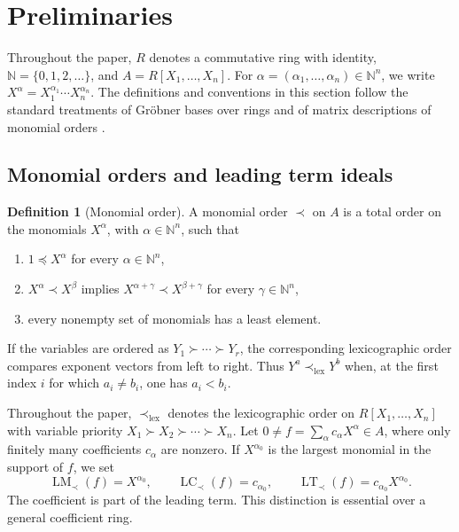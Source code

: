 \documentclass[preprint,12pt,3p]{elsarticle}
\theoremstyle{definition}
\newtheorem{definition}[theorem]{Definition}
\theoremstyle{remark}
\newcommand{\LC}{\operatorname{LC}}
\newcommand{\LT}{\operatorname{LT}}
\newcommand{\LM}{\operatorname{LM}}
\begin{document}
	\section{Preliminaries}\label{sec:preliminaries}
	
	Throughout the paper, $R$ denotes a commutative ring with identity,
	$\mathbb{N}=\{0,1,2,\ldots\}$, and
	$A=R[X_1,\ldots,X_n]$. For
	$\alpha=(\alpha_1,\ldots,\alpha_n)\in\mathbb{N}^n$, we write
	$X^\alpha=X_1^{\alpha_1}\cdots X_n^{\alpha_n}$. The definitions and
	conventions in this section follow the standard treatments of
	Gr\"obner bases over rings and of matrix descriptions of monomial
	orders
	\cite{AdamsLoustaunau1994,Pauer2007,Robbiano1985,Robbiano1986,
		KemperTrungAnh2018,LombardiNeuwirthYengui2026,Yengui2015Book}.
	
	\subsection{Monomial orders and leading term ideals}
	
	\begin{definition}[Monomial order]\label{def:monomial-order}
		A monomial order $\prec$ on $A$ is a total order on the monomials
		$X^\alpha$, with $\alpha\in\mathbb{N}^n$, such that
		\begin{enumerate}
			\item $1\preceq X^\alpha$ for every $\alpha\in\mathbb{N}^n$,
			\item $X^\alpha\prec X^\beta$ implies
			$X^{\alpha+\gamma}\prec X^{\beta+\gamma}$ for every
			$\gamma\in\mathbb{N}^n$,
			\item every nonempty set of monomials has a least element.
		\end{enumerate}
	\end{definition}
	
	If the variables are ordered as
	$Y_1\succ\cdots\succ Y_r$, the corresponding lexicographic order
	compares exponent vectors from left to right. Thus
	$Y^a\prec_{\mathrm{lex}}Y^b$ when, at the first index $i$ for which
	$a_i\neq b_i$, one has $a_i<b_i$.
	
	Throughout the paper, $\prec_{\mathrm{lex}}$ denotes the
	lexicographic order on $R[X_1,\ldots,X_n]$ with variable priority
	$X_1\succ X_2\succ\cdots\succ X_n$. Let $0\neq f=\sum_{\alpha}c_\alpha X^\alpha\in A$, where only
	finitely many coefficients $c_\alpha$ are nonzero. If $X^{\alpha_0}$
	is the largest monomial in the support of $f$, we set
	\[
	\LM_\prec(f)=X^{\alpha_0},\qquad
	\LC_\prec(f)=c_{\alpha_0},\qquad
	\LT_\prec(f)=c_{\alpha_0}X^{\alpha_0}.
	\]
	The coefficient is part of the leading term. This distinction is
	essential over a general coefficient ring.
	
\end{document}
